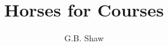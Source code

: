 \documentclass[]{memoir}
\title{Horses for Courses}
\author{G.B. Shaw}
\begin{document}
\begin{titlingpage}
\maketitle
\end{titlingpage}


\begin{abstract}

\end{abstract}

\section{}
\end{document}
